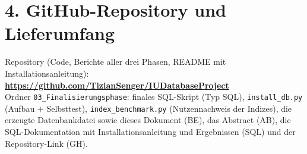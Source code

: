 \documentclass[11pt,a4paper]{article}
\begin{document}
\section*{4. GitHub-Repository und Lieferumfang}
Repository (Code, Berichte aller drei Phasen, README mit Installationsanleitung):\\
\textbf{\url{https://github.com/TizianSenger/IUDatabaseProject}}\\
Ordner \texttt{03\_Finalisierungsphase}: finales SQL-Skript (Typ SQL), \texttt{install\_db.py} (Aufbau + Selbsttest), \texttt{index\_benchmark.py} (Nutzennachweis der Indizes), die erzeugte Datenbankdatei sowie dieses Dokument (BE), das Abstract (AB), die SQL-Dokumentation mit Installationsanleitung und Ergebnissen (SQL) und der Repository-Link (GH).
\end{document}
